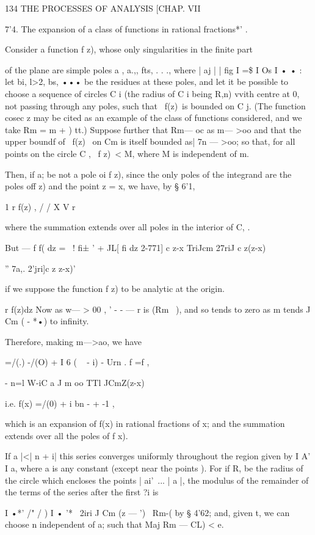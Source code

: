 134 THE PROCESSES OF ANALYSIS [CHAP. VII

  7'4. The expansion of a class of functions in rational fractions*' .

  Consider a function f z), whose only singularities in the finite
part

of the plane are simple poles a , a.,, fts, . . ., where | aj | | fig
I =\$ I Os I • • : let bi, l>2, bs, ••• be the residues at these
poles, and let it be possible to choose a sequence of circles C i (the
radius of C i being R,n) vvith centre at 0, not passing through any
poles, such that \ f(z)\ is bounded on C j. (The function cosec z may
be cited as an example of the class of functions considered, and we
take Rm = m + ) tt.) Suppose further that Rm— oc as m— >oo and that
the upper boundf of \ f(z) \ on Cm is itself bounded as| 7n — >oo; so
that, for all points on the circle C , \ f z)\ < M, where M is
independent of m.

Then, if a; be not a pole oi f z), since the only poles of the
integrand are the poles off z) and the point z = x, we have, by § 6'1,

1 r f(z) , / / X V r

where the summation extends over all poles in the interior of C, .

But — f f( dz = ~! fi± ' + JL[ fi dz 2-771] c z-x TriJcm 27riJ c
z(z-x)

  '' 7a,. 2'jri]c z z-x)'

if we suppose the function f z) to be analytic at the origin.

r f(z)dz Now as w— > 00 , ' - - — r is (Rm~ ), and so tends to zero as
m tends J Cm ( - *•) to infinity.

Therefore, making m—>ao, we have

=/(.) -/(O) + I 6 ( ~ - i) - Urn . f =f ,

- n=l W-iC a J m oo TTl JCmZ(z-x)

i.e. f(x) =/(0) + i bn - + -1 ,

which is an expansion of f(x) in rational fractions of x; and the
summation extends over all the poles of f x).

If a |<| n + i| this series converges uniformly throughout the region
given by I A' I a, where a is any constant (except near the points ).
For if R, be the radius of the circle which encloses the points |
ai'\, ... | a |, the modulus of the remainder of the terms of the
series after the first ?i is

I •*' /" / ) I • '* \ 2iri J Cm (z — ') \ Rm-( by § 4'62; and, given
t, we can choose n independent of a; such that Maj Rm — CL) < e.

